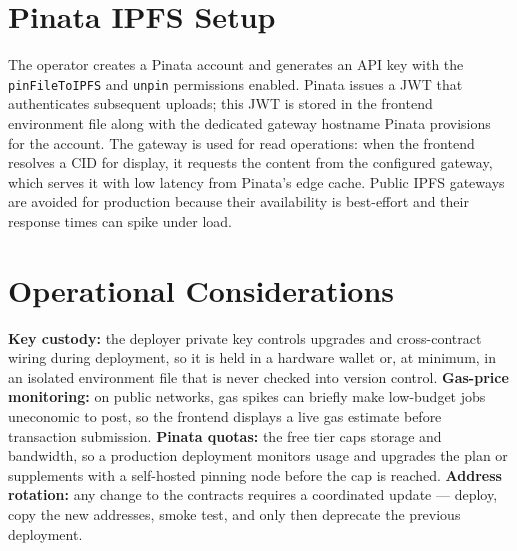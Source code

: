 \section{Pinata IPFS Setup}

The operator creates a Pinata account and generates an API key with the \texttt{pinFileToIPFS} and \texttt{unpin} permissions enabled. Pinata issues a JWT that authenticates subsequent uploads; this JWT is stored in the frontend environment file along with the dedicated gateway hostname Pinata provisions for the account. The gateway is used for read operations: when the frontend resolves a CID for display, it requests the content from the configured gateway, which serves it with low latency from Pinata's edge cache. Public IPFS gateways are avoided for production because their availability is best-effort and their response times can spike under load.

\section{Operational Considerations}

\textbf{Key custody:} the deployer private key controls upgrades and cross-contract wiring during deployment, so it is held in a hardware wallet or, at minimum, in an isolated environment file that is never checked into version control. \textbf{Gas-price monitoring:} on public networks, gas spikes can briefly make low-budget jobs uneconomic to post, so the frontend displays a live gas estimate before transaction submission. \textbf{Pinata quotas:} the free tier caps storage and bandwidth, so a production deployment monitors usage and upgrades the plan or supplements with a self-hosted pinning node before the cap is reached. \textbf{Address rotation:} any change to the contracts requires a coordinated update --- deploy, copy the new addresses, smoke test, and only then deprecate the previous deployment.
